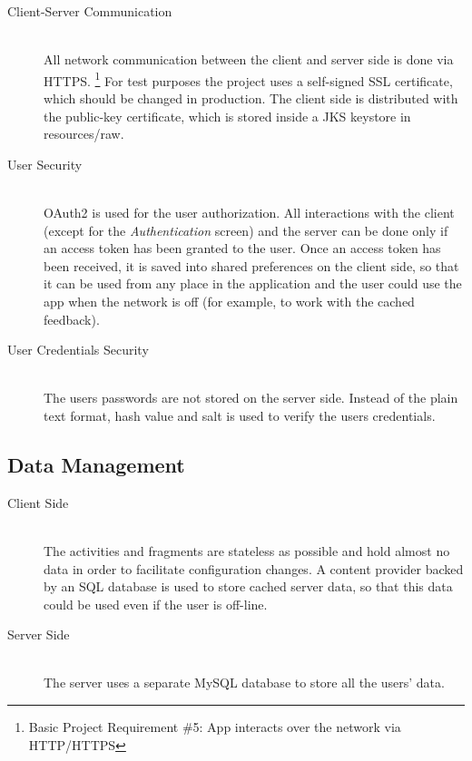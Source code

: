 \documentclass{article}
\begin{document}
    \begin{description}
        \item[Client-Server Communication] \hfill \\
            All network communication between the client and server side is done via HTTPS.
            \footnote{Basic Project Requirement \#5: App interacts over the network via HTTP/HTTPS}
            For test purposes the project uses a self-signed SSL certificate, which should be changed in production. The client side is distributed with the public-key certificate, which is stored inside a JKS keystore in resources/raw. 
        \item[User Security] \hfill \\
            OAuth2 is used for the user authorization. All interactions with the client (except for the \emph{Authentication} screen) and the server can be done only if an access token has been granted to the user. Once an access token has been received, it is saved into shared preferences on the client side, so that it can be used from any place in the application and the user could use the app when the network is off (for example, to work with the cached feedback).
        \item[User Credentials Security] \hfill \\
            The users passwords are not stored on the server side. Instead of the plain text format, hash value and salt is used to verify the users credentials.
    \end{description}

    \subsection{Data Management}

    \begin{description}
        \item[Client Side] \hfill \\
            The activities and fragments are stateless as possible and hold almost no data in order to facilitate configuration changes. A content provider backed by an SQL database is used to store cached server data, so that this data could be used even if the user is off-line.
        \item[Server Side] \hfill \\
            The server uses a separate MySQL database to store all the users' data.
    \end{description}
\end{document}
